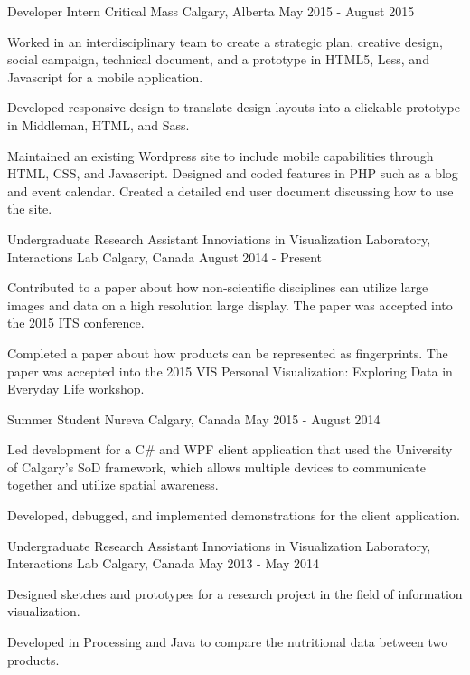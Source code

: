 \begin{cventries}
  \cventry
    {Developer Intern}
    {Critical Mass}
    {Calgary, Alberta}
    {May 2015 - August 2015}
    {
      \begin{cvitems}
        \item {Worked in an interdisciplinary team to create a strategic plan, creative design, social campaign, technical document, and a prototype in HTML5, Less, and Javascript for a mobile application.}
        \item {Developed responsive design to translate design layouts into a clickable prototype in Middleman, HTML, and Sass.}
        \item {Maintained an existing Wordpress site to include mobile capabilities through HTML, CSS, and Javascript. Designed and coded features in PHP such as a blog and event calendar. Created a detailed end user document discussing how to use the site.}
      \end{cvitems}
    }
  \cventry
    {Undergraduate Research Assistant}
    {Innoviations in Visualization Laboratory, Interactions Lab}
    {Calgary, Canada}
    {August 2014 - Present}
    {
      \begin{cvitems}
        \item {Contributed to a paper about how non-scientific disciplines can utilize large images and data on a high resolution large display. The paper was accepted into the 2015 ITS conference.}
        \item {Completed a paper about how products can be represented as fingerprints. The paper was accepted into the 2015 VIS Personal Visualization: Exploring Data in Everyday Life workshop.}
      \end{cvitems}
    }
  \cventry
    {Summer Student}
    {Nureva}
    {Calgary, Canada}
    {May 2015 - August 2014}
    {
      \begin{cvitems}
        \item {Led development for a C\# and WPF client application that used the University of Calgary’s SoD framework, which allows multiple devices to communicate together and utilize spatial awareness.}
        \item {Developed, debugged, and implemented demonstrations for the client application.}
      \end{cvitems}  
    }
  \cventry
    {Undergraduate Research Assistant}
    {Innoviations in Visualization Laboratory, Interactions Lab}
    {Calgary, Canada}
    {May 2013 - May 2014}
    {
      \begin{cvitems}
        \item {Designed sketches and prototypes for a research project in the field of information visualization.}
        \item {Developed in Processing and Java to compare the nutritional data between two products.}
      \end{cvitems}
    }
\end{cventries}

